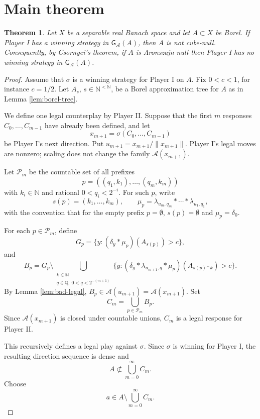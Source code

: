 \documentclass[11pt]{amsart}
\newtheorem{theorem}{Theorem}
\newcommand{\N}{\mathbb N}
\newcommand{\Q}{\mathbb Q}
\newcommand{\Acal}{\mathcal A}
\newcommand{\Pcal}{\mathcal P}
\begin{document}
\section*{Main theorem}

\begin{theorem}\label{thm:main}
Let \(X\) be a separable real Banach space and let \(A\subset X\) be Borel.  If
Player I has a winning strategy in \(\mathsf G_{\Acal}(A)\), then \(A\) is not
cube-null.  Consequently, by Csornyei's theorem, if \(A\) is Aronszajn-null then
Player I has no winning strategy in \(\mathsf G_{\Acal}(A)\).
\end{theorem}

\begin{proof}
Assume that \(\sigma\) is a winning strategy for Player I on \(A\).  Fix
\(0<c<1\), for instance \(c=1/2\).  Let \(A_s\), \(s\in\N^{<\N}\), be a Borel
approximation tree for \(A\) as in Lemma \ref{lem:borel-tree}.

We define one legal counterplay by Player II.  Suppose that the first \(m\)
responses \(C_0,\ldots,C_{m-1}\) have already been defined, and let
\[
  x_{m+1}=\sigma(C_0,\ldots,C_{m-1})
\]
be Player I's next direction.  Put \(u_{m+1}=x_{m+1}/\|x_{m+1}\|\).  Player I's
legal moves are nonzero; scaling does not change the family \(\Acal(x_{m+1})\).

Let \(\Pcal_m\) be the countable set of all prefixes
\[
  p=((q_1,k_1),\ldots,(q_m,k_m))
\]
with \(k_i\in\N\) and rational \(0<q_i<2^{-i}\).  For such \(p\), write
\[
  s(p)=(k_1,\ldots,k_m),\qquad
  \mu_p=\lambda_{u_m,q_m}*\cdots *\lambda_{u_1,q_1},
\]
with the convention that for the empty prefix \(p=\emptyset\),
\(s(p)=\emptyset\) and \(\mu_p=\delta_0\).

For each \(p\in\Pcal_m\), define
\[
  G_p=\{y:(\delta_y*\mu_p)(A_{s(p)})>c\},
\]
and
\[
  B_p=G_p\setminus
  \bigcup_{\substack{k\in\N\\q\in\Q,\ 0<q<2^{-(m+1)}}}
  \{y:(\delta_y*\lambda_{u_{m+1},q}*\mu_p)(A_{s(p)^\frown k})>c\}.
\]
By Lemma \ref{lem:bad-legal}, \(B_p\in\Acal(u_{m+1})=\Acal(x_{m+1})\).  Set
\[
  C_m=\bigcup_{p\in\Pcal_m} B_p.
\]
Since \(\Acal(x_{m+1})\) is closed under countable unions, \(C_m\) is a legal
response for Player II.

This recursively defines a legal play against \(\sigma\).  Since \(\sigma\) is
winning for Player I, the resulting direction sequence is dense and
\[
  A\not\subset \bigcup_{m=0}^{\infty} C_m.
\]
Choose
\[
  a\in A\setminus\bigcup_{m=0}^{\infty}C_m.
\]


\end{proof}
\end{document}
